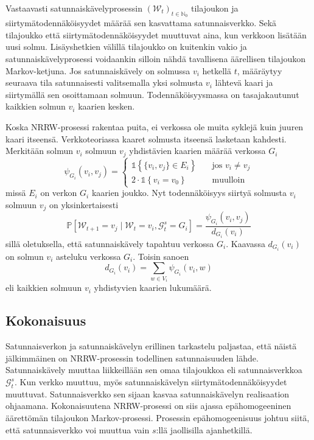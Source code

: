 \documentclass[finnish, 12pt, a4paper, sci, utf8, pdfa]{aaltothesis}
\newcommand{\N}{\mathbb{N}}
\newcommand{\Grandom}{\mathcal{G}}
\newcommand{\Wrandom}{\mathcal{W}}
\newcommand{\indicator}{\mathopen{\mathds{1}}}
\newcommand*{\prob}{\mathbb{P}}
\begin{document}
Vastaavasti satunnaiskävelyprosessin \( (\Wrandom_{t})_{t \in \N_{0}} \) tilajoukon ja siirtymätodennäköisyydet määrää sen kasvattama satunnaisverkko. Sekä tilajoukko että siirtymätodennäköisyydet muuttuvat aina, kun verkkoon lisätään uusi solmu. Lisäyshetkien välillä tilajoukko on kuitenkin vakio ja satunnaiskävelyprosessi voidaankin silloin nähdä tavallisena äärellisen tilajoukon Markov-ketjuna. Jos satunnaiskävely on solmussa \( v_{i} \) hetkellä \( t \), määräytyy seuraava tila satunnaisesti valitsemalla yksi solmusta \( v_{i} \) lähtevä kaari ja siirtymällä sen osoittamaan solmuun. Todennäköisyysmassa on tasajakautunut kaikkien solmun \( v_{i} \) kaarien kesken. 

Koska NRRW-prosessi rakentaa puita, ei verkossa ole muita syklejä kuin juuren kaari itseensä. Verkkoteoriassa kaaret solmusta itseensä lasketaan kahdesti. Merkitään solmun \( v_{i} \) solmuun \( v_{j} \) yhdistävien kaarien määrää verkossa $ G_{i} $
\[
   \psi_{G_{i}}(v_{i}, v_{j}) = 
      \begin{cases}
         \indicator \left\{ \{ v_{i}, v_{j} \} \in E_{i} \right\} & \quad \text{jos } v_{i} \neq v_{j} \\
         2 \cdot \indicator \left\{ v_{i} = v_{0} \right\}        & \quad \text{muulloin}
      \end{cases}
   \label{equation:psi}
\]
missä \( E_{i} \) on verkon \( G_{i} \) kaarien joukko. Nyt todennäköisyys siirtyä solmusta \( v_{i} \) solmuun \( v_{j} \) on yksinkertaisesti
\begin{equation}
   \prob \left[ \Wrandom_{t+1} = v_{j} \mid \Wrandom_{t} = v_{i}, \Grandom_{t}^{s} = G_{i} \right] = \frac{\psi_{G_{i}}(v_{i}, v_{j})}{d_{G_{i}}(v_{i})}
   \label{equation:verkko-tn}
\end{equation}
sillä oletuksella, että satunnaiskävely tapahtuu verkossa $ G_{i} $. Kaavassa \( d_{G_{i}}(v_{i}) \) on solmun \( v_{i} \) asteluku verkossa $ G_{i} $. Toisin sanoen
\begin{equation}
   d_{G_{i}}(v_{i}) = \sum_{w \in V_{i}} \psi_{G_{i}}(v_{i}, w)
   \label{equation:asteluku}
\end{equation}
eli kaikkien solmuun \( v_{i} \) yhdistyvien kaarien lukumäärä.

\subsection{Kokonaisuus}

Satunnaisverkon ja satunnaiskävelyn erillinen tarkastelu paljastaa, että näistä jälkimmäinen on NRRW-prosessin todellinen satunnaisuuden lähde. Satunnaiskävely muuttaa liikkeillään sen omaa tilajoukkoa eli satunnaisverkkoa \( \Grandom_{t}^{s} \). Kun verkko muuttuu, myös satunnaiskävelyn siirtymätodennäköisyydet muuttuvat. Satunnaisverkko sen sijaan kasvaa satunnaiskävelyn realisaation ohjaamana. Kokonaisuutena NRRW-prosessi on siis ajassa epähomogeeninen äärettömän tilajoukon Markov-prosessi. Prosessin epähomogeenisuus johtuu siitä, että satunnaisverkko voi muuttua vain $ s $:llä jaollisilla ajanhetkillä.
\end{document}
